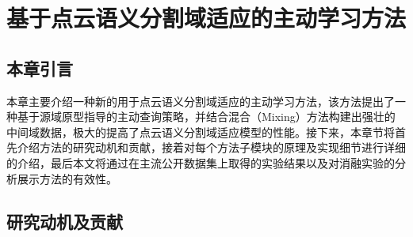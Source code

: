 

\chapter{基于点云语义分割域适应的主动学习方法}
\thispagestyle{others}
\pagestyle{others}
\xiaosi

\section{本章引言}
本章主要介绍一种新的用于点云语义分割域适应的主动学习方法，该方法提出了一种基于源域原型指导的主动查询策略，并结合混合（Mixing）方法构建出强壮的中间域数据，极大的提高了点云语义分割域适应模型的性能。接下来，本章节将首先介绍方法的研究动机和贡献，接着对每个方法子模块的原理及实现细节进行详细的介绍，最后本文将通过在主流公开数据集上取得的实验结果以及对消融实验的分析展示方法的有效性。

\section{研究动机及贡献}


